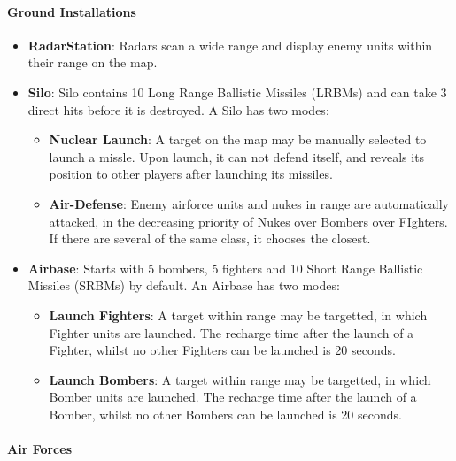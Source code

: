         \paragraph{Ground Installations}
        
        \begin{itemize}
        \item \textbf{RadarStation}: Radars scan a wide range and display enemy units within their range on the map.
        \item \textbf{Silo}: Silo contains 10 Long Range Ballistic Missiles (LRBMs) and can take 3 direct hits before it is destroyed. A Silo has two modes: 
            \begin{itemize}
               \item \textbf{Nuclear Launch}: A target on the map may be manually selected to launch a missle. Upon launch, it can not defend itself, and reveals its position to other players after launching its missiles. 
               \item \textbf{Air-Defense}: Enemy airforce units and nukes in range are automatically attacked, in the decreasing priority of Nukes over Bombers over FIghters. If there are several of the same class, it chooses the closest. 
            \end{itemize}
        \item \textbf{Airbase}: Starts with 5 bombers, 5 fighters and 10 Short Range Ballistic Missiles (SRBMs) by default. An Airbase has two modes:
            \begin{itemize}
            \item \textbf{Launch Fighters}: A target within range may be targetted, in which Fighter units are launched. The recharge time after the launch of a Fighter, whilst no other Fighters can be launched is 20 seconds.
            \item \textbf{Launch Bombers}: A target within range may be targetted, in which Bomber units are launched. The recharge time after the launch of a Bomber, whilst no other Bombers can be launched is 20 seconds.
            \end{itemize}
        \end{itemize}
         
        \paragraph{Air Forces}

